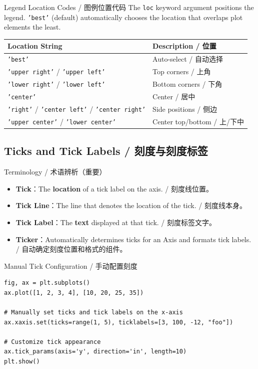 \documentclass[11pt,a4paper]{report}
\let\oldtexttt\texttt
\renewcommand{\texttt}[1]{\textcolor{mainblue}{\oldtexttt{#1}}}
\begin{document}
\begin{concept}{Legend Location Codes / 图例位置代码}
    The \texttt{loc} keyword argument positions the legend. \texttt{'best'} (default) automatically chooses the location that overlaps plot elements the least.

    \medskip
    \centering
    \small
    \begin{tabularx}{\linewidth}{@{}lX@{}}
    \toprule
    \textbf{Location String} & \textbf{Description / 位置} \\ \midrule
    \texttt{'best'} & Auto-select / 自动选择 \\
    \texttt{'upper right'} / \texttt{'upper left'} & Top corners / 上角 \\
    \texttt{'lower right'} / \texttt{'lower left'} & Bottom corners / 下角 \\
    \texttt{'center'} & Center / 居中 \\
    \texttt{'right'} / \texttt{'center left'} / \texttt{'center right'} & Side positions / 侧边 \\
    \texttt{'upper center'} / \texttt{'lower center'} & Center top/bottom / 上/下中 \\ \bottomrule
    \end{tabularx}
\end{concept}

\subsection{Ticks and Tick Labels / 刻度与刻度标签}

\begin{concept}{Terminology / 术语辨析（重要）}
    \begin{itemize}[itemsep=0.3em]
        \item \textbf{Tick}：The \textbf{location} of a tick label on the axis. / 刻度线位置。
        \item \textbf{Tick Line}：The line that denotes the location of the tick. / 刻度线本身。
        \item \textbf{Tick Label}：The \textbf{text} displayed at that tick. / 刻度标签文字。
        \item \textbf{Ticker}：Automatically determines ticks for an Axis and formats tick labels. / 自动确定刻度位置和格式的组件。
    \end{itemize}
\end{concept}

\begin{examplebox}{Manual Tick Configuration / 手动配置刻度}
\begin{lstlisting}
fig, ax = plt.subplots()
ax.plot([1, 2, 3, 4], [10, 20, 25, 35])

# Manually set ticks and tick labels on the x-axis
ax.xaxis.set(ticks=range(1, 5), ticklabels=[3, 100, -12, "foo"])

# Customize tick appearance
ax.tick_params(axis='y', direction='in', length=10)
plt.show()
\end{lstlisting}
\end{examplebox}
\end{document}
